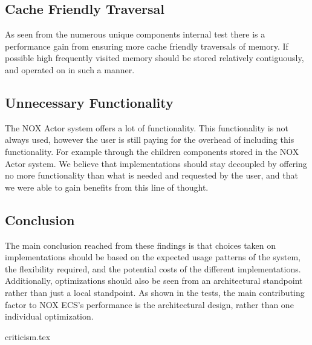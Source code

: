 \subsection{Cache Friendly Traversal}
As seen from the numerous unique components internal test there is a performance gain from
ensuring more cache friendly traversals of memory.
If possible high frequently visited memory should be stored relatively contiguously,
and operated on in such a manner.

\subsection{Unnecessary Functionality}
The NOX Actor system offers a lot of functionality. This functionality is not always used,
however the user is still paying for the overhead of including this functionality. For example through the children components
stored in the NOX Actor system.
We believe that implementations should stay decoupled by offering no more functionality than what is needed
and requested by the user, and that we were able to gain benefits from this line of thought.

\subsection{Conclusion}
The main conclusion reached from these findings is that choices taken on implementations
should be based on the expected usage patterns of the system, the flexibility required,
and the potential costs of the different implementations.
Additionally, optimizations should also be seen from an architectural standpoint rather than
just a local standpoint. As shown in the tests, the main contributing factor to NOX ECS's performance
is the architectural design, rather than one individual optimization.

{criticism.tex}
